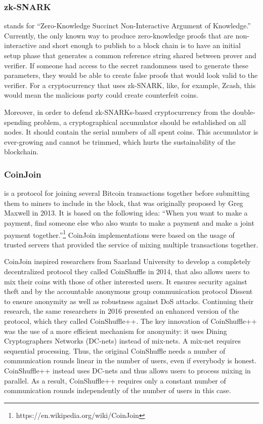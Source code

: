 \documentclass[a4paper, 10pt, conference]{ieeeconf}
\begin{document}
\subsubsection{zk-SNARK} stands for ``Zero-Knowledge Succinct Non-Interactive Argument of Knowledge.'' Currently, the only known way to produce zero-knowledge proofs that are non-interactive and short enough to publish to a block chain is to have an initial setup phase that generates a common reference string shared between prover and verifier. If someone had access to the secret randomness used to generate these parameters, they would be able to create false proofs that would look valid to the verifier. For a cryptocurrency that uses zk-SNARK, like, for example, Zcash, this would mean the malicious party could create counterfeit coins. 

Moreover, in order to defend zk-SNARKs-based cryptocurrency from the double-spending problem, a cryptographical accumulator should be established on all nodes. It should contain the serial numbers of all spent coins. This accumulator is ever-growing and cannot be trimmed, which hurts the sustainability of the blockchain.

\subsubsection{CoinJoin} is a protocol for joining several Bitcoin transactions together before submitting them to miners to include in the block, that was originally proposed by Greg Maxwell in 2013. It is based on the following idea: ``When you want to make a payment, find someone else who also wants to make a payment and make a joint payment together.''\footnote{https://en.wikipedia.org/wiki/CoinJoin} CoinJoin implementations were based on the usage of trusted servers that provided the service of mixing multiple transactions together.

CoinJoin inspired researchers from Saarland University to develop a completely decentralized protocol they called CoinShuffle\cite{c17} in 2014, that also allows users to mix their coins with those of other interested users. It ensures security against theft and by the accountable anonymous group communication protocol Dissent to ensure anonymity as
well as robustness against DoS attacks. Continuing their research, the same researchers in 2016 presented an enhanced version of the protocol, which they called CoinShuffle++\cite{c18}. The key innovation of CoinShuffle++ was the use of a more efficient mechanism for anonymity: it uses Dining Cryptographers Networks (DC-nets)\cite{c20} instead of mix-nets. A mix-net requires sequential processing. Thus, the original CoinShuffle needs a number of communication rounds linear in the number of users, even if everybody is honest. CoinShuffle++ instead uses DC-nets and thus allows users to process mixing in parallel. As a result, CoinShuffle++ requires only a constant number of communication rounds independently of the number of users in this case. 
\end{document}
